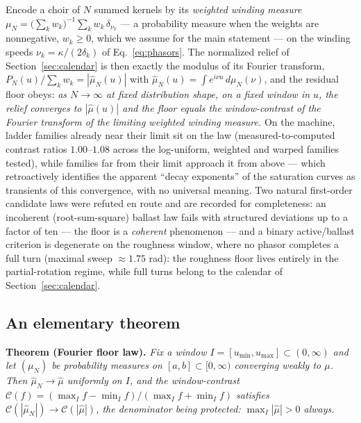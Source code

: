\documentclass[11pt,a4paper]{article}
\begin{document}
Encode a choir of $N$ summed kernels by its \emph{weighted winding
measure}
$\mu_N = \bigl(\sum_k w_k\bigr)^{-1} \sum_k w_k\, \delta_{\nu_k}$ --- a
probability measure when the weights are nonnegative, $w_k \geq 0$, which we
assume for the main statement --- on the
winding speeds $\nu_k = \kappa/(2\delta_k)$ of
Eq.~\eqref{eq:phasors}. The normalized relief of
Section~\ref{sec:calendar} is then exactly the modulus of its Fourier
transform, $P_N(u)/\sum_k w_k = |\hat{\mu}_N(u)|$ with
$\hat{\mu}_N(u) = \int e^{i\nu u}\, d\mu_N(\nu)$, and the residual floor
obeys:
\emph{as $N \to \infty$ at fixed distribution shape, on a fixed window in
$u$, the relief converges to $|\hat{\mu}(u)|$ and the floor equals the
window-contrast of the Fourier transform of the limiting weighted winding
measure.} On the machine, ladder families already near their limit sit on
the law (measured-to-computed contrast ratios $1.00$--$1.08$ across the
log-uniform, weighted and warped families tested), while families far
from their limit approach it from above --- which retroactively
identifies the apparent ``decay exponents'' of the saturation curves as
transients of this convergence, with no universal meaning. Two natural
first-order candidate laws were refuted en route and are recorded for
completeness: an incoherent (root-sum-square) ballast law fails with
structured deviations up to a factor of ten --- the floor is a
\emph{coherent} phenomenon --- and a binary active/ballast criterion is
degenerate on the roughness window, where no phasor completes a full
turn (maximal sweep $\approx 1.75$ rad): the roughness floor lives
entirely in the partial-rotation regime, while full turns belong to the
calendar of Section~\ref{sec:calendar}.

\subsection{An elementary theorem}
\label{sec:theorem}

\medskip\noindent\textbf{Theorem (Fourier floor law).}
\emph{Fix a window $I = [u_{\min}, u_{\max}] \subset (0,\infty)$ and let
$(\mu_N)$ be probability measures on $[a,b] \subset [0,\infty)$
converging weakly to $\mu$. Then $\hat{\mu}_N \to \hat{\mu}$ uniformly on
$I$, and the window-contrast
$\mathcal{C}(f) = (\max_I f - \min_I f)/(\max_I f + \min_I f)$ satisfies
$\mathcal{C}(|\hat{\mu}_N|) \to \mathcal{C}(|\hat{\mu}|)$, the denominator being protected:
$\max_I |\hat{\mu}| > 0$ always.}
\end{document}
